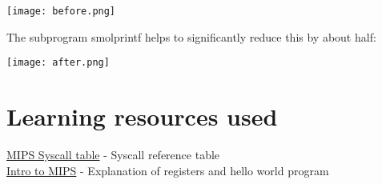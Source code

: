 \documentclass{article}
\begin{document}
\begin{center}
  \texttt{[image: before.png]}
\end{center}

The subprogram smolprintf helps to significantly reduce this by
about half:

\begin{center}
  \texttt{[image: after.png]}
\end{center}

\section{Learning resources used}
\href{https://courses.missouristate.edu/kenvollmar/mars/help/syscallhelp.html}{MIPS Syscall table} 
- Syscall reference table \\
\href{https://www.youtube.com/watch?v=5AN4Fo0GiBI&t=525s}{Intro to MIPS} -
Explanation of registers and hello world program
\end{document}
